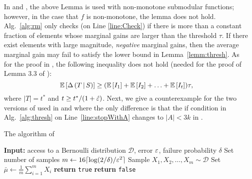 In  and ,
the above Lemma is used with non-monotone submodular functions;
however, in the case that $f$ is non-monotone, the lemma does not hold.
Alg.~\ref{alg:rm} only checks (on Line \ref{line:Check}) if there is 
more than a constant fraction of 
elements whose marginal gains are larger than the threshold $\tau$.
If there exist elements with
large magnitude, \textit{negative} marginal gains, then
the average marginal gain may fail to satisfy
the lower bound in Lemma~\ref{lemm:thresh}.
As for the proof in ,
the following inequality does not hold (needed for the proof of Lemma
3.3 of ):
\[\mathbb{E} \left[ \Delta \left( T \, | \, S \right) \right]\ge (\mathbb{E} \left[ I_1 \right]+\mathbb{E} \left[ I_2 \right] +\ldots +\mathbb{E} \left[ I_t \right])\tau,\]
where $|T| = t^*$ and $t\ge t^*/(1+\hat{\varepsilon})$.
Next, we give a counterexample for the two versions of \thresam used in 
 and  
where the only difference is that
the if condition in Alg.~\ref{alg:thresh}
on Line~\ref{line:stopWithA} changes to $|A|<3k$
in .
\begin{algorithm}[t] 
  \caption{The \reducedmean algorithm of } \label{alg:rm}
  \begin{algorithmic}[1]
  \State \textbf{Input:} access to a Bernoulli distribution $\mathcal D$,
 error $\varepsilon$, failure probability $\delta$
 \State Set number of samples $m \gets 16 \lceil \log (2 / \delta ) / \varepsilon^2 \rceil$
 \State Sample $X_1, X_2, \ldots, X_m \sim \mathcal D$
 \State Set $\bar \mu \gets \frac{1}{m} \sum_{i = 1}^m X_i$
 \State \textbf{return} \texttt{true}
 \EndIf
 \State \textbf{return} \texttt{false}
 \end{algorithmic}
 \end{algorithm}
